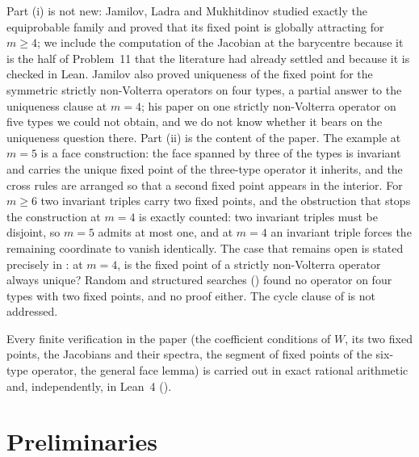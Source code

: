 \documentclass[11pt]{amsart}
\theoremstyle{definition}
\begin{document}
Part (i) is not new: Jamilov, Ladra and Mukhitdinov \cite{JLM17} studied exactly the equiprobable family and proved that its fixed point is globally attracting for $m\ge4$; we include the computation of the Jacobian at the barycentre because it is the half of Problem~11 that the literature had already settled and because it is checked in Lean. Jamilov \cite{Jam16} also proved uniqueness of the fixed point for the symmetric strictly non-Volterra operators on four types, a partial answer to the uniqueness clause at $m=4$; his paper on one strictly non-Volterra operator on five types \cite{Jam17} we could not obtain, and we do not know whether it bears on the uniqueness question there. Part (ii) is the content of the paper. The example at $m=5$ is a face construction: the face spanned by three of the types is invariant and carries the unique fixed point of the three-type operator it inherits, and the cross rules are arranged so that a second fixed point appears in the interior. For $m\ge6$ two invariant triples carry two fixed points, and the obstruction that stops the construction at $m=4$ is exactly counted: two invariant triples must be disjoint, so $m=5$ admits at most one, and at $m=4$ an invariant triple forces the remaining coordinate to vanish identically. The case that remains open is stated precisely in : at $m=4$, is the fixed point of a strictly non-Volterra operator always unique? Random and structured searches () found no operator on four types with two fixed points, and no proof either. The cycle clause of  is not addressed.

Every finite verification in the paper (the coefficient conditions of $W$, its two fixed points, the Jacobians and their spectra, the segment of fixed points of the six-type operator, the general face lemma) is carried out in exact rational arithmetic and, independently, in Lean~4 ().

\section{Preliminaries}\label{sec:prelim}
\end{document}
